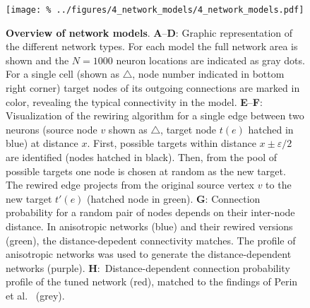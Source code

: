 
\begin{figure}[h]
    \vspace{0.25cm}
    \texttt{[image: \%
      ../figures/4\_network\_models/4\_network\_models.pdf]} %
  \vspace{-0.1cm}
  \caption{{\bf Overview of network models}. \textbf{A}--\textbf{D}:
    Graphic representation of the different network types. For each
    model the full network area is shown and the $N=1000$ neuron
    locations are indicated as gray dots. For a single cell (shown as
    $\bigtriangleup$, node number indicated in bottom right corner)
    target nodes of its outgoing connections are marked in color,
    revealing the typical connectivity in the model. %
    \textbf{E}--\textbf{F}: Visualization of the rewiring algorithm
    for a single edge between two neurons (source node $v$ shown as
    $\bigtriangleup$, target node $t(e)$ hatched in blue) at distance
    $x$. First, possible targets within distance $x \pm \varepsilon/2$
    are identified (nodes hatched in black). Then, from the pool of
    possible targets one node is chosen at random as the new
    target. The rewired edge projects from the original source vertex
    $v$ to the new target $t'(e)$ (hatched node in green). \textbf{G}:
    Connection probability for a random pair of nodes depends on their
    inter-node distance. In anisotropic networks (blue) and their
    rewired versions (green), the distance-depedent connectivity
    matches. The profile of anisotropic networks was used to generate
    the distance-dependent networks
    (purple). \textbf{H}:~Distance-dependent connection probability
    profile of the tuned network (red), matched to the findings of
    Perin et al.~\cite{Perin2011} (grey).}
\label{fig:4_net_models}
\end{figure}
